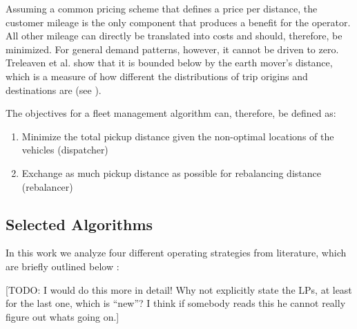 Assuming a common pricing scheme that defines a price per distance, the customer mileage is the only component that produces a benefit for the operator. All other mileage can directly be translated into costs and should, therefore, be minimized. For general
demand patterns, however, it cannot be driven to zero. Treleaven et al. \cite{treleaven2011asymptotically} show that it is bounded below by the earth mover's distance, which is a measure of how different the distributions of trip origins and destinations are (see \cite{ruschendorf1985wasserstein}).

The objectives for a fleet management algorithm can, therefore, be defined as:

\begin{enumerate}
\item Minimize the total pickup distance given the non-optimal locations of the vehicles (dispatcher)
\item Exchange as much pickup distance as possible for rebalancing distance (rebalancer)
\end{enumerate}

\subsection{Selected Algorithms}

In this work we analyze four different operating strategies from literature, which are briefly outlined below :

[TODO: I would do this more in detail! Why not explicitly state the LPs, at least for the last one, which is ``new''? I think if somebody reads this he cannot really figure out whats going on.]


